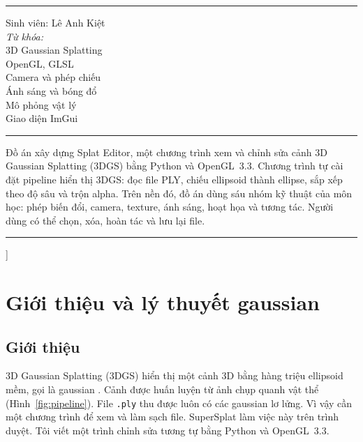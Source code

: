 \documentclass[9pt,twocolumn,a4paper]{extarticle}
\newcommand{\code}[1]{\texttt{#1}}
\newcommand{\spaced}[1]{\textls[160]{#1}}
\begin{document}
{\begin{@twocolumnfalse}
\noindent\begin{minipage}[t]{0.255\textwidth}
{\footnotesize\spaced{T H Ô N G \ \ T I N}\par}
\vspace{2pt}\noindent\rule{\linewidth}{0.4pt}\par\vspace{3pt}
{\scriptsize Sinh viên: Lê Anh Kiệt\\[3pt]
\textit{Từ khóa:}\\
3D Gaussian Splatting\\
OpenGL, GLSL\\
Camera và phép chiếu\\
Ánh sáng và bóng đổ\\
Mô phỏng vật lý\\
Giao diện ImGui\par}
\end{minipage}\hfill
\begin{minipage}[t]{0.715\textwidth}
{\footnotesize\spaced{T Ó M \ \ T Ắ T}\par}
\vspace{2pt}\noindent\rule{\linewidth}{0.4pt}\par\vspace{3pt}
{\scriptsize\setlength{\parindent}{0pt}\linespread{1.08}\selectfont
Đồ án xây dựng Splat Editor, một chương trình xem và chỉnh sửa cảnh 3D Gaussian Splatting (3DGS) bằng Python và OpenGL~3.3. Chương trình tự cài đặt pipeline hiển thị 3DGS: đọc file PLY, chiếu ellipsoid thành ellipse, sắp xếp theo độ sâu và trộn alpha. Trên nền đó, đồ án dùng sáu nhóm kỹ thuật của môn học: phép biến đổi, camera, texture, ánh sáng, hoạt họa và tương tác. Người dùng có thể chọn, xóa, hoàn tác và lưu lại file.\par}
\end{minipage}

\vspace{0.25cm}
\noindent\rule{\textwidth}{0.4pt}
\vspace{0.35cm}
\end{@twocolumnfalse}
}]

\section{Giới thiệu và lý thuyết gaussian}
\label{chap:theory}

\subsection{Giới thiệu}
3D Gaussian Splatting (3DGS) hiển thị một cảnh 3D bằng hàng triệu ellipsoid mềm, gọi là gaussian \cite{kerbl2023gaussian}. Cảnh được huấn luyện từ ảnh chụp quanh vật thể (Hình~\ref{fig:pipeline}). File \code{.ply} thu được luôn có các gaussian lơ lửng. Vì vậy cần một chương trình để xem và làm sạch file. SuperSplat \cite{supersplat} làm việc này trên trình duyệt. Tôi viết một trình chỉnh sửa tương tự bằng Python và OpenGL~3.3.
\end{document}
